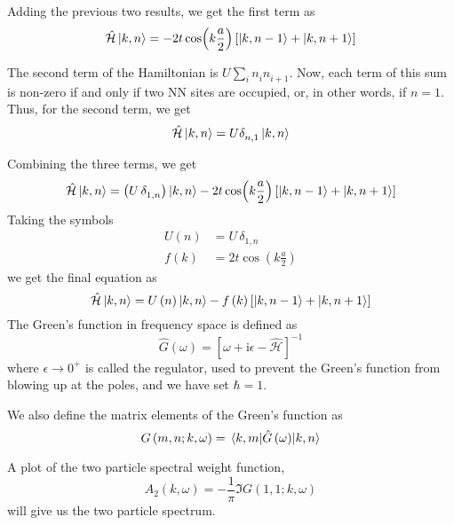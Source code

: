 \documentclass[a4paper, 11pt]{report}
\newcommand{\I}{\mathrm{i}}
\begin{document}
Adding the previous two results, we get the first term as
\begin{displaymath}
\hat{\mathcal{H}}\ket{k,n} = -2 t \cos(k \frac{a}{2})\left[ \ket{k, n - 1} + \ket{k, n + 1} \right]
\end{displaymath}

The second term of the Hamiltonian is $U \sum_{i} n^{}_{i} n^{}_{i + 1}$. Now, each term of this sum is non-zero if and only if two NN sites are occupied, or, in other words, if $n=1$. Thus, for the second term, we get
\begin{displaymath}
\hat{\mathcal{H}}\ket{k,n} = U \delta^{}_{n,1}\ket{k,n}
\end{displaymath}

Combining the three terms, we get
\begin{equation}
\hat{\mathcal{H}} \ket{k,n} = \left( U\, \delta^{}_{1,n} \right) \ket{k, n} - 2 t \cos(k \frac{a}{2})\left[ \ket{k, n - 1} + \ket{k, n + 1} \right]
\end{equation}
Taking the symbols
\begin{displaymath}
\begin{split}
U\left(n\right) &= U\, \delta^{}_{1,n}\\
f\left(k\right) &= 2 t \cos(k \frac{a}{2})
\end{split}
\end{displaymath}
we get the final equation as
\begin{equation}\label{eqn:H_kn}
\hat{\mathcal{H}} \ket{k,n} = U\left(n\right) \ket{k, n} - f\left(k\right)\left[ \ket{k, n - 1} + \ket{k, n + 1} \right]
\end{equation}
The Green's function in frequency space is defined as
\begin{equation}\label{eqn:GreenFunc}
\hat{G}\left(\omega\right) = \left[ \omega + \I \epsilon - \hat{\mathcal{H}} \right]^{-1}
\end{equation}
where $\epsilon \longrightarrow 0^{+}$ is called the regulator, used to prevent the Green's function from blowing up at the poles, and we have set $\hbar = 1$.

We also define the matrix elements of the Green's function as
\begin{equation}\label{eqn:GF_mel}
G\left(m, n; k, \omega \right) = \mel{k, m}{\hat{G}\left(\omega\right)}{k, n}
\end{equation}

A plot of the two particle spectral weight function,
\begin{equation}\label{eqn:SpectralWeight}
A_2 \left( k, \omega \right) = - \frac{1}{\pi} \Im{G\left(1, 1; k, \omega \right)}
\end{equation}
will give us the two particle spectrum.
\end{document}

